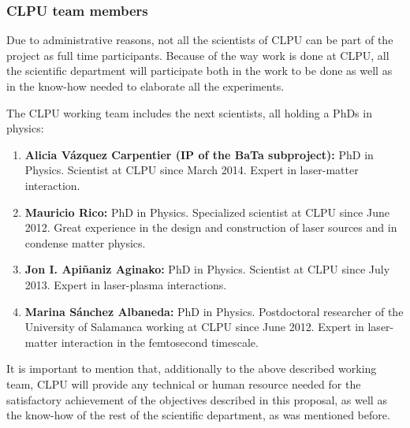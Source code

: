 
\subsubsection*{CLPU team members}

Due to administrative reasons, not all the scientists of CLPU can be part of the project as full time participants. Because of the way work is done at CLPU, all the scientific department will participate both in the work to be done as well as in the know-how needed to elaborate all the experiments.

The CLPU working team includes the next scientists, all holding a PhDs in physics:

\begin{enumerate}

\item {\bf Alicia V\'azquez Carpentier (IP of the BaTa subproject):} PhD in Physics. Scientist at CLPU since March 2014. Expert in
laser-matter interaction.



\item {\bf Mauricio Rico:} PhD in Physics. Specialized scientist at CLPU since June 2012. Great experience in the
design and construction of laser sources and in condense matter physics.

\item {\bf Jon I. Api\~naniz Aginako:} PhD in Physics. Scientist at CLPU since July 2013. Expert in
laser-plasma interactions.

\item {\bf Marina S\'anchez Albaneda:} PhD in Physics. Postdoctoral researcher of the University of
Salamanca working at CLPU since June 2012. Expert in laser-matter interaction in the femtosecond
timescale.


\end{enumerate}

It is important to mention that, additionally to the above described working team, CLPU will provide any technical or human resource needed for the satisfactory achievement of the objectives described in this proposal, as well as the know-how of the rest of the scientific department, as was mentioned before.  


